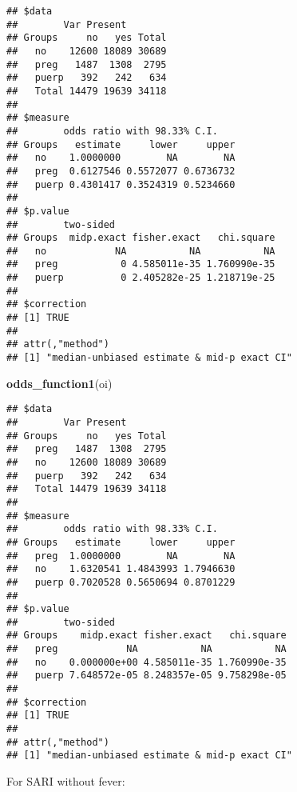 \documentclass[
]{article}
\newenvironment{Shaded}{\begin{snugshade}}{\end{snugshade}}
\newcommand{\DataTypeTok}[1]{\textcolor[rgb]{0.13,0.29,0.53}{#1}}
\newcommand{\KeywordTok}[1]{\textcolor[rgb]{0.13,0.29,0.53}{\textbf{#1}}}
\newcommand{\NormalTok}[1]{#1}
\newcommand{\OperatorTok}[1]{\textcolor[rgb]{0.81,0.36,0.00}{\textbf{#1}}}
\newcommand{\OtherTok}[1]{\textcolor[rgb]{0.56,0.35,0.01}{#1}}
\newcommand{\StringTok}[1]{\textcolor[rgb]{0.31,0.60,0.02}{#1}}
\begin{document}
\begin{verbatim}
## $data
##        Var Present
## Groups     no   yes Total
##   no    12600 18089 30689
##   preg   1487  1308  2795
##   puerp   392   242   634
##   Total 14479 19639 34118
## 
## $measure
##        odds ratio with 98.33% C.I.
## Groups   estimate     lower     upper
##   no    1.0000000        NA        NA
##   preg  0.6127546 0.5572077 0.6736732
##   puerp 0.4301417 0.3524319 0.5234660
## 
## $p.value
##        two-sided
## Groups  midp.exact fisher.exact   chi.square
##   no            NA           NA           NA
##   preg           0 4.585011e-35 1.760990e-35
##   puerp          0 2.405282e-25 1.218719e-25
## 
## $correction
## [1] TRUE
## 
## attr(,"method")
## [1] "median-unbiased estimate & mid-p exact CI"
\end{verbatim}

\begin{Shaded}
\begin{Highlighting}[]
\KeywordTok{odds_function1}\NormalTok{(oi)}
\end{Highlighting}
\end{Shaded}

\begin{verbatim}
## $data
##        Var Present
## Groups     no   yes Total
##   preg   1487  1308  2795
##   no    12600 18089 30689
##   puerp   392   242   634
##   Total 14479 19639 34118
## 
## $measure
##        odds ratio with 98.33% C.I.
## Groups   estimate     lower     upper
##   preg  1.0000000        NA        NA
##   no    1.6320541 1.4843993 1.7946630
##   puerp 0.7020528 0.5650694 0.8701229
## 
## $p.value
##        two-sided
## Groups    midp.exact fisher.exact   chi.square
##   preg            NA           NA           NA
##   no    0.000000e+00 4.585011e-35 1.760990e-35
##   puerp 7.648572e-05 8.248357e-05 9.758298e-05
## 
## $correction
## [1] TRUE
## 
## attr(,"method")
## [1] "median-unbiased estimate & mid-p exact CI"
\end{verbatim}

For SARI without fever:

\begin{Shaded}
\end{Shaded}
\end{document}
